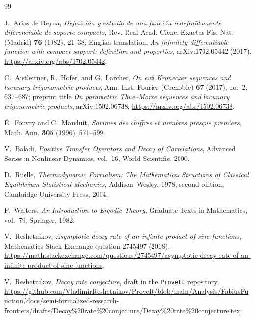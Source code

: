 \documentclass[11pt,oneside]{article}
\theoremstyle{definition}
\theoremstyle{remark}
\begin{document}
\begin{thebibliography}{99}

J.~Arias de Reyna,
\emph{Definici\'on y estudio de una funci\'on indefinidamente diferenciable de soporte compacto},
Rev. Real Acad. Cienc. Exactas F\'is. Nat. (Madrid) \textbf{76} (1982), 21--38;
English translation, \emph{An infinitely differentiable function with compact support:
definition and properties}, arXiv:1702.05442 (2017),
\url{https://arxiv.org/abs/1702.05442}.

C.~Aistleitner, R.~Hofer, and G.~Larcher,
\emph{On evil Kronecker sequences and lacunary trigonometric products},
Ann. Inst. Fourier (Grenoble) \textbf{67} (2017), no.~2, 637--687;
preprint title \emph{On parametric Thue--Morse sequences and lacunary trigonometric products},
arXiv:1502.06738,
\url{https://arxiv.org/abs/1502.06738}.

\'E.~Fouvry and C.~Mauduit,
\emph{Sommes des chiffres et nombres presque premiers},
Math. Ann. \textbf{305} (1996), 571--599.

V.~Baladi,
\emph{Positive Transfer Operators and Decay of Correlations},
Advanced Series in Nonlinear Dynamics, vol.~16, World Scientific, 2000.

D.~Ruelle,
\emph{Thermodynamic Formalism: The Mathematical Structures of Classical Equilibrium
Statistical Mechanics},
Addison--Wesley, 1978; second edition, Cambridge University Press, 2004.

P.~Walters,
\emph{An Introduction to Ergodic Theory},
Graduate Texts in Mathematics, vol.~79, Springer, 1982.

V.~Reshetnikov,
\emph{Asymptotic decay rate of an infinite product of sinc functions},
Mathematics Stack Exchange question 2745497 (2018),
\url{https://math.stackexchange.com/questions/2745497/asymptotic-decay-rate-of-an-infinite-product-of-sinc-functions}.

V.~Reshetnikov,
\emph{Decay rate conjecture}, draft in the \texttt{ProveIt} repository,
\url{https://github.com/VladimirReshetnikov/ProveIt/blob/main/Analysis/FabiusFunction/docs/semi-formalized-research-frontiers/drafts/Decay%20rate%20conjecture/Decay%20rate%20conjecture.tex}.

\end{thebibliography}
\end{document}
